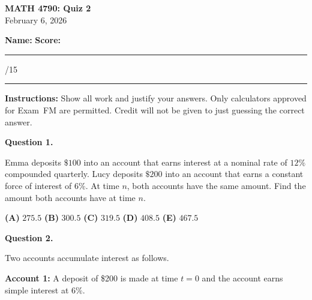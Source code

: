 \documentclass[11pt]{article}
\begin{document}
\begin{center}
    {\Large \textbf{MATH 4790: Quiz 2}}\\[0.3em]
    February 6, 2026
\end{center}

\vspace{1em}

\textbf{Name:} \hfill \textbf{Score:} \rule{1.5cm}{0.4pt}/15

\vspace{1em}

\hrule
\vspace{1em}

\textbf{Instructions:} Show all work and justify your answers. Only calculators approved for Exam~FM are permitted. Credit will not be given to just guessing the correct answer.

\vspace{1em}


\noindent\textbf{Question 1.}  

Emma deposits $\$100$ into an account that earns interest at a nominal rate of $12\%$ compounded quarterly. Lucy deposits $\$200$ into an account that earns a constant force of interest of $6\%$. At time $n$, both accounts have the same amount. Find the amount both accounts have at time $n$.

\medskip

\begin{center}

\textbf{(A)} $275.5$
\hspace{1cm}
\textbf{(B)} $300.5$
\hspace{1cm}
\textbf{(C)} $319.5$
\hspace{1cm}
\textbf{(D)} $408.5$
\hspace{1cm}
\textbf{(E)} $467.5$

\end{center}

\newpage


\textbf{Question 2.}

Two accounts accumulate interest as follows.

\medskip

\textbf{Account 1:} A deposit of \$200 is made at time $t=0$ and the account earns simple interest at $6\%$.

\medskip
\end{document}

